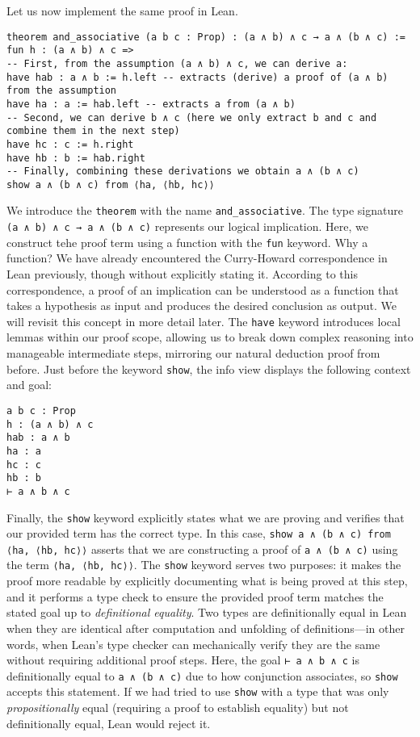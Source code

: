 \begin{example}
Let us now implement the same proof in Lean.
\begin{lstlisting}[language=lean]
theorem and_associative (a b c : Prop) : (a ∧ b) ∧ c → a ∧ (b ∧ c) :=
fun h : (a ∧ b) ∧ c =>
-- First, from the assumption (a ∧ b) ∧ c, we can derive a:
have hab : a ∧ b := h.left -- extracts (derive) a proof of (a ∧ b) from the assumption
have ha : a := hab.left -- extracts a from (a ∧ b)
-- Second, we can derive b ∧ c (here we only extract b and c and combine them in the next step)
have hc : c := h.right
have hb : b := hab.right
-- Finally, combining these derivations we obtain a ∧ (b ∧ c)
show a ∧ (b ∧ c) from ⟨ha, ⟨hb, hc⟩⟩
\end{lstlisting}
We introduce the \lstinline[language=lean]|theorem| with the name
\lstinline[language=lean]|and_associative|.
The type signature \lstinline[language=lean]|(a ∧ b) ∧ c → a ∧ (b ∧ c)|
represents our logical implication.
Here, we construct tehe proof term using a function with the \lstinline[language=lean]|fun| keyword.
Why a function? We have already encountered the Curry-Howard correspondence in Lean
previously, though without explicitly stating it.
According to this correspondence, a proof of an implication can be
understood as a function that takes a hypothesis as input and produces
the desired conclusion as output. We will revisit this concept in more
detail later.
The \lstinline[language=lean]|have| keyword introduces local
lemmas within our proof scope, allowing us to break down complex
reasoning into manageable intermediate steps, mirroring our natural deduction proof from before.
Just before the keyword \lstinline[language=lean]|show|, the info view displays the following 
context and goal:
\begin{lstlisting}[language=lean]
a b c : Prop
h : (a ∧ b) ∧ c
hab : a ∧ b
ha : a
hc : c
hb : b
⊢ a ∧ b ∧ c
\end{lstlisting}
Finally, the \lstinline[language=lean]|show| keyword explicitly states what 
we are proving and verifies that our provided term has the correct type. 
In this case, \lstinline[language=lean]|show a ∧ (b ∧ c) from ⟨ha, ⟨hb, hc⟩⟩| 
asserts that we are constructing a proof of \lstinline[language=lean]|a ∧ (b ∧ c)| 
using the term \lstinline[language=lean]|⟨ha, ⟨hb, hc⟩⟩|. 
The \lstinline[language=lean]|show| keyword serves two purposes: 
it makes the proof more readable by explicitly documenting what is being proved at this step, 
and it performs a type check to ensure the provided proof term matches the stated 
goal up to \emph{definitional equality}. 
Two types are definitionally equal in Lean when they are identical after computation 
and unfolding of definitions—in other words, when Lean's type checker 
can mechanically verify they are the same without requiring additional proof steps. 
Here, the goal \lstinline[language=lean]|⊢ a ∧ b ∧ c| is definitionally 
equal to \lstinline[language=lean]|a ∧ (b ∧ c)| due to how conjunction 
associates, so \lstinline[language=lean]|show| accepts this statement. 
If we had tried to use \lstinline[language=lean]|show| with a type that 
was only \emph{propositionally} equal (requiring a proof to establish equality) 
but not definitionally equal, Lean would reject it.
\end{example}
